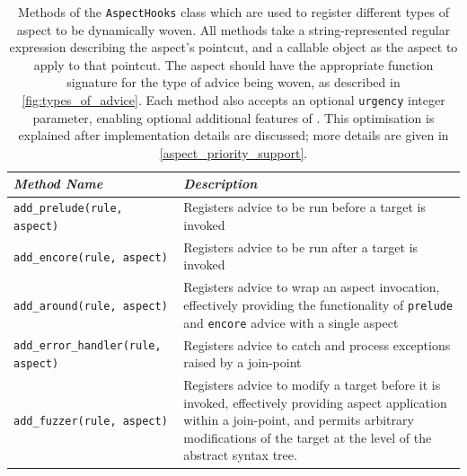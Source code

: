 \begin{table}
    \centering
    \begin{tabular}{@{}lp{}@{}}
        \toprule
        \emph{Method Name} & \emph{Description}\\
        \midrule
        \lstinline[]$add_prelude(rule, aspect)$ &
            Registers advice to be run before a target is invoked\\
        \rule{0pt}{2em}\lstinline[]$add_encore(rule, aspect)$ &
            Registers advice to be run after a target is invoked\\
        \rule{0pt}{2em}\lstinline[]$add_around(rule, aspect)$ &
            Registers advice to wrap an aspect invocation, effectively providing
            the functionality of \lstinline[]$prelude$ and \lstinline[]$encore$
            advice with a single aspect\\
        \rule{0pt}{2em}\lstinline[]$add_error_handler(rule, aspect)$ &
            Registers advice to catch and process exceptions raised by a join-point\\
        \rule{0pt}{2em}\lstinline[]$add_fuzzer(rule, aspect)$ &
            Registers advice to modify a target before it is invoked,
            effectively providing aspect application within a join-point, and
            permits arbitrary modifications of the target at the level of the
            abstract syntax tree.\\
        \bottomrule
    \end{tabular}
    \caption{Methods of the \lstinline{AspectHooks} class which are used to
    register different types of aspect to be dynamically woven. All methods take
    a string-represented regular expression describing the aspect's pointcut,
    and a callable object as the aspect to apply to that pointcut. The aspect
    should have the appropriate function signature for the type of advice being
    woven, as described in \cref{fig:types_of_advice}. Each method also accepts an
    optional \lstinline{urgency} integer parameter, enabling optional additional
    features of \pdsfthree{}. This optimisation is explained after implementation
    details are discussed; more details are given in
    \cref{aspect_priority_support}.}
    \label{aspect_registration_methods}
\end{table}

